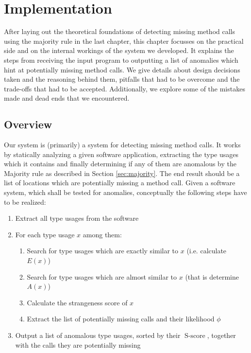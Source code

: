 \chapter{Implementation}\label{ch:impl}


After laying out the theoretical foundations of detecting missing method calls using the majority rule in the last chapter, this chapter focusses on the practical side and on the internal workings of the system we developed.
It explains the steps from receiving the input program to outputting a list of anomalies which hint at potentially missing method calls.
We give details about design decisions taken and the reasoning behind them, pitfalls that had to be overcome and the trade-offs that had to be accepted.
Additionally, we explore some of the mistakes made and dead ends that we encountered.

\section{Overview}

Our system is (primarily) a system for detecting missing method calls.
It works by statically analyzing a given software application, extracting the type usages which it contains and finally determining if any of them are anomalous by the Majority rule as described in Section \ref{sec:majority}.
The end result should be a list of locations which are potentially missing a method call.
Given a software system, which shall be tested for anomalies, conceptually the following steps have to be realized:

\begin{enumerate}
    \item Extract all type usages from the software
    \item For each type usage $x$ among them:
    \begin{enumerate}
        \item Search for type usages which are exactly similar to $x$ (i.e. calculate $E(x)$)
        \item Search for type usages which are almost similar to $x$ (that is determine $A(x)$)
        \item Calculate the strangeness score of $x$
        \item Extract the list of potentially missing calls and their likelihood $\phi$
    \end{enumerate}
    \item Output a list of anomalous type usages, sorted by their $\operatorname{S-score}$, together with the calls they are potentially missing
\end{enumerate}

